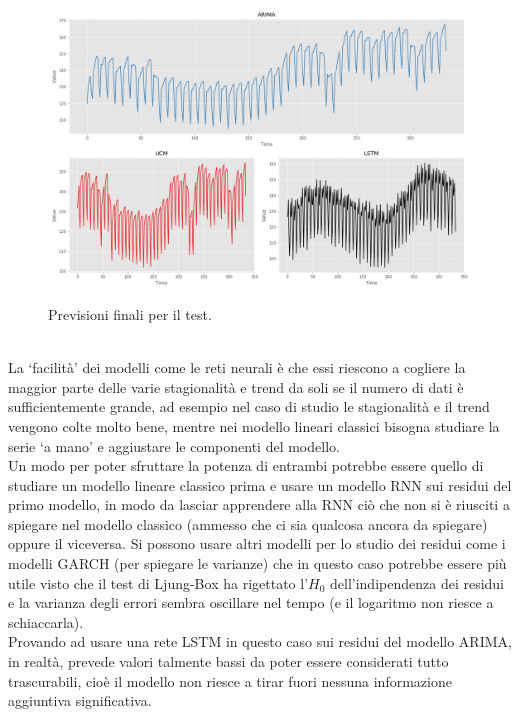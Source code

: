 \documentclass[12pt, onecolumn]{article}
\begin{document}
\begin{figure}[!h]
  \centering
  \includegraphics[width=\linewidth,height=8cm]{imgs/test_results.png}
  \caption{Previsioni finali per il test.}
  \label{fig:test_pred}
\end{figure}\\
La `facilità' dei modelli come le reti neurali è che essi riescono a cogliere la maggior parte delle varie stagionalità e trend da soli se il numero di dati è sufficientemente grande, ad esempio nel caso di studio le stagionalità e il trend vengono colte molto bene, mentre nei modello lineari classici bisogna studiare la serie `a mano' e aggiustare le componenti del modello.\\
Un modo per poter sfruttare la potenza di entrambi potrebbe essere quello di studiare un modello lineare classico prima e usare un modello RNN sui residui del primo modello, in modo da lasciar apprendere alla RNN ciò che non si è riusciti a spiegare nel modello classico (ammesso che ci sia qualcosa ancora da spiegare) oppure il viceversa.
Si possono usare altri modelli per lo studio dei residui come i modelli GARCH (per spiegare le varianze) che in questo caso potrebbe essere più utile visto che il test di Ljung-Box ha rigettato l'$H_0$ dell'indipendenza dei residui e la varianza degli errori sembra oscillare nel tempo (e il logaritmo non riesce a schiaccarla).\\
Provando ad usare una rete LSTM in questo caso sui residui del modello ARIMA, in realtà, prevede valori talmente bassi da poter essere considerati tutto trascurabili, cioè il modello non riesce a tirar fuori nessuna informazione aggiuntiva significativa.
\end{document}
